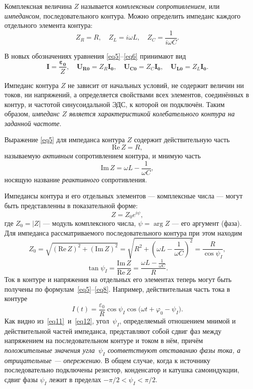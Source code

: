 \documentclass[a4paper, 12pt]{article}
\begin{document}
Комплексная величина $Z$ называется \textit{комплексным сопротивлением}, или \textit{импедансом}, последовательного контура. Можно определить импеданс каждого отдельного элемента контура:
\begin{equation}\label{eq7}
Z_R = R, \quad Z_L = i\omega L, \quad Z_C = \frac{1}{i\omega C}.
\end{equation}

В новых обозначениях уравнения \eqref{eq5}--\eqref{eq6} принимают вид
\begin{equation}\label{eq8}
\mathbf{I} = \frac{\mathbf{\varepsilon_0}}{Z}, \quad \mathbf{U_{R0}} = Z_R\mathbf{I_0}, \quad \mathbf{U_{C0}} = Z_C\mathbf{I_0}, \quad \mathbf{U_{L0}} = Z_L\mathbf{I_0}.
\end{equation}

Импеданс контура $Z$ не зависит от начальных условий, не содержит величин ни токов, ни напряжений, а определяется свойствами всех элементов, соединённых в контур, и частотой синусоидальной ЭДС, к которой он подключён. Таким образом, \textit{импеданс $Z$ является характеристикой колебательного контура на заданной частоте}.

Выражение \eqref{eq5} для импеданса контура $Z$ содержит действительную часть $$\mathrm{Re}\,Z = R,$$ называемую \textit{активным} сопротивлением контура, и мнимую часть $$\mathrm{Im}\,Z = \omega L - \frac{1}{\omega C},$$ носящую название \textit{реактивного} сопротивления.

Импедансы контура и его отдельных элементов --- комплексные числа --- могут быть представленны в показательной форме:
\begin{equation}\label{eq9}
Z = Z_0e^{i\psi},
\end{equation}
где $Z_0 = |Z|$ --- модуль комплексного числа, $\psi = \arg{Z}$ --- его аргумент (фаза). Для импеданса рассматриваемого последовательного контура при этом находим
\begin{equation}\label{eq10}
Z_0 = \sqrt{(\mathrm{Re}\,Z)^2 + (\mathrm{Im}\,Z)^2} = \sqrt{R^2 + \left(\omega L - \frac{1}{\omega C}\right)^2} = \frac{R}{\cos{\psi_I}},
\end{equation}
\begin{equation}\label{eq11}
\tan{\psi_I} = \frac{\mathrm{Im}\,Z}{\mathrm{Re}\,Z} = \frac{\omega L - \frac{1}{\omega C}}{R}.
\end{equation}
Ток в контуре и напряжения на отдельных его элементах теперь могут быть получены по формулам~\eqref{eq5}--\eqref{eq8}. Например, действительная часть тока в контуре
\begin{equation}\label{eq12}
I(t) = \frac{\varepsilon_0}{R}\cos{\psi_I}\cos({\omega t + \varphi_0 - \psi_I)}.
\end{equation}
Как видно из~\eqref{eq11}~и~\eqref{eq12}, угол~$\psi_I$, определяемый отношением мнимой и действительной частей импеданса, представляют собой сдвиг фаз между напряжением на последовательном контуре и током в нём, причём \textit{положительные значения угла~$\psi_I$ соответствуют отставанию фазы тока, а отрицательные --- опережению}. В общем случае, когда к источнику последовательно подключены резистор, конденсатор и катушка самоиндукции, сдвиг фазы $\psi_I$ лежит в пределах $-\pi/2 < \psi_I < \pi/2$.
\end{document}
